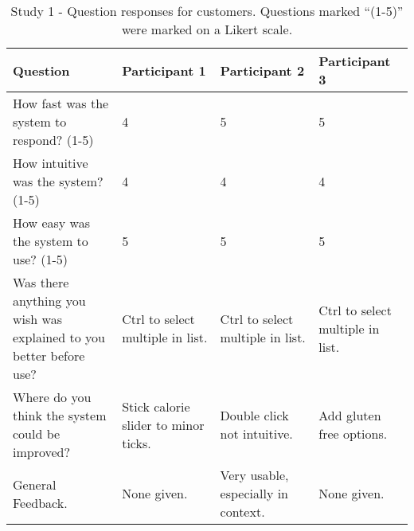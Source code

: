 \begin{table}[h]
    \centering
    \begin{tabular}{ |p{}|p{}|p{}|p{}| }
    \hline
    \textbf{Question} & \textbf{Participant 1} & \textbf{Participant 2} & \textbf{Participant 3} \\
    \hline
    How fast was the system to respond? (1-5) & 4 & 5 & 5 \\
    \hline
    How intuitive was the system? (1-5) & 4 & 4 & 4 \\
    \hline
    How easy was the system to use? (1-5) & 5 & 5 & 5 \\
    \hline
    Was there anything you wish was explained to you better before use? & Ctrl to select multiple in list. &Ctrl to select multiple in list.  & Ctrl to select multiple in list. \\
    \hline
    Where do you think the system could be improved? & Stick calorie slider to minor ticks. & Double click not intuitive. & Add gluten free options. \\
    \hline
    General Feedback. & None given. & Very usable, especially in context. & None given. \\
    \hline
    \end{tabular}
    \captionsetup{justification=centering}
    \caption[Study 1 - Question responses from customers]{Study 1 - Question responses for customers. Questions marked ``(1-5)'' were marked on a Likert scale.}
    \label{tab:Study1AnswersC}
\end{table}


